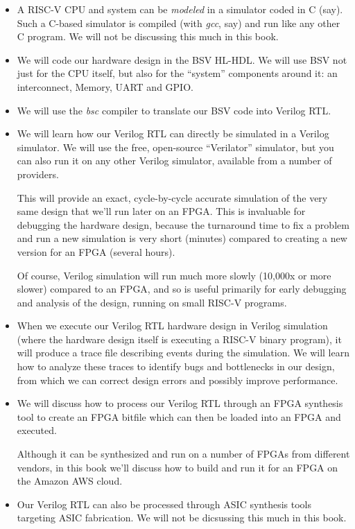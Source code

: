 \begin{itemize}

\item A RISC-V CPU and system can be \emph{modeled} in a simulator
      coded in C (say).  Such a C-based simulator is compiled (with
      \emph{gcc}, say) and run like any other C program. We will not
      be discussing this much in this book.

\item We will code our hardware design in the BSV HL-HDL.  We will use
      BSV not just for the CPU itself, but also for the ``system''
      components around it: an interconnect, Memory, UART and GPIO.

\item We will use the \emph{bsc} compiler to translate our BSV code
      into Verilog RTL.

\item We will learn how our Verilog RTL can directly be simulated in a
      Verilog simulator.  We will use the free, open-source
      ``Verilator'' simulator, but you can also run it on any other
      Verilog simulator, available from a number of providers.

      This will provide an exact, cycle-by-cycle accurate simulation
      of the very same design that we'll run later on an FPGA.  This
      is invaluable for debugging the hardware design, because the
      turnaround time to fix a problem and run a new simulation is
      very short (minutes) compared to creating a new version for an
      FPGA (several hours).

      Of course, Verilog simulation will run much more slowly (10,000x
      or more slower) compared to an FPGA, and so is useful primarily
      for early debugging and analysis of the design, running on small
      RISC-V programs.

\item When we execute our Verilog RTL hardware design in Verilog
      simulation (where the hardware design itself is executing a
      RISC-V binary program), it will produce a trace file describing
      events during the simulation.  We will learn how to analyze
      these traces to identify bugs and bottlenecks in our design,
      from which we can correct design errors and possibly improve
      performance.

\item We will discuss how to process our Verilog RTL through an FPGA
      synthesis tool to create an FPGA bitfile which can then be
      loaded into an FPGA and executed.

      Although it can be synthesized and run on a number of FPGAs from
      different vendors, in this book we'll discuss how to build and
      run it for an FPGA on the Amazon AWS cloud.

\item Our Verilog RTL can also be processed through ASIC synthesis
      tools targeting ASIC fabrication.  We will not be dicsussing
      this much in this book.

\end{itemize}

